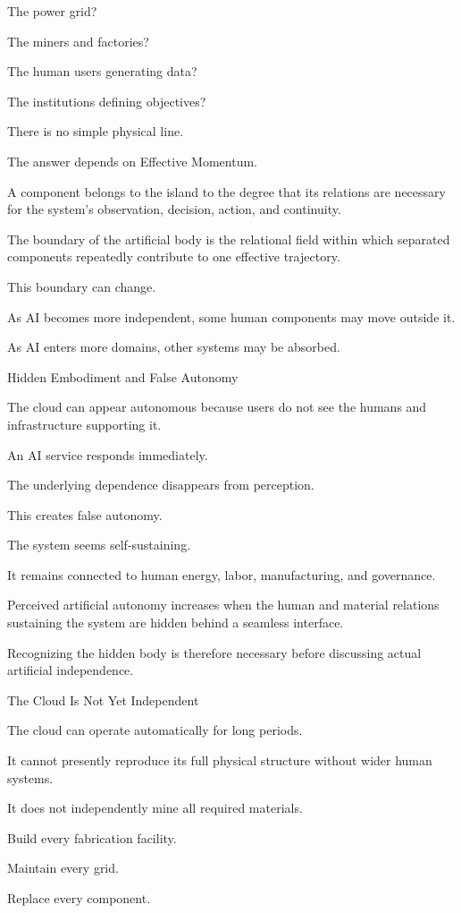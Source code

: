 The power grid?

The miners and factories?

The human users generating data?

The institutions defining objectives?

There is no simple physical line.

The answer depends on Effective Momentum.

A component belongs to the island to the degree that its relations are necessary for the system’s observation, decision, action, and continuity.

The boundary of the artificial body is the relational field within which separated components repeatedly contribute to one effective trajectory.

This boundary can change.

As AI becomes more independent, some human components may move outside it.

As AI enters more domains, other systems may be absorbed.

Hidden Embodiment and False Autonomy

The cloud can appear autonomous because users do not see the humans and infrastructure supporting it.

An AI service responds immediately.

The underlying dependence disappears from perception.

This creates false autonomy.

The system seems self-sustaining.

It remains connected to human energy, labor, manufacturing, and governance.

Perceived artificial autonomy increases when the human and material relations sustaining the system are hidden behind a seamless interface.

Recognizing the hidden body is therefore necessary before discussing actual artificial independence.

The Cloud Is Not Yet Independent

The cloud can operate automatically for long periods.

It cannot presently reproduce its full physical structure without wider human systems.

It does not independently mine all required materials.

Build every fabrication facility.

Maintain every grid.

Replace every component.

